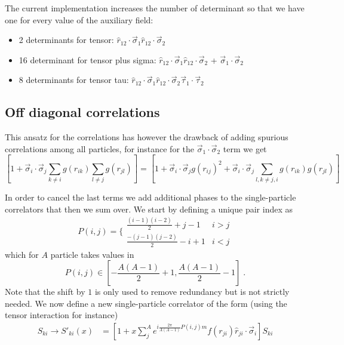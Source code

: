 \documentclass[a4paper]{article}
\begin{document}
The current implementation increases the number of determinant so that we have one for every value of the auxiliary field:
\begin{itemize}
\item 2 determinants for tensor: $\hat{r}_{12}\cdot\vec{\sigma}_1 \hat{r}_{12}\cdot\vec{\sigma}_2$
\item 16 determinant for tensor plus sigma: $\hat{r}_{12}\cdot\vec{\sigma}_1 \hat{r}_{12}\cdot\vec{\sigma}_2$ + $\vec{\sigma}_1\cdot\vec{\sigma}_2$
\item 8 determinants for tensor tau: $\hat{r}_{12}\cdot\vec{\sigma}_1 \hat{r}_{12}\cdot\vec{\sigma}_2\vec{\tau}_1\cdot\vec{\tau}_2$
\end{itemize}

\subsection{Off diagonal correlations}
This ansatz for the correlations has however the drawback of adding spurious correlations among all particles, for instance for the $\vec{\sigma}_1\cdot\vec{\sigma}_2$ term we get
\begin{equation}
\left[1+\vec{\sigma}_i\cdot\vec{\sigma}_j \sum_{k\neq i}g(r_{ik})\sum_{l\neq j}g(r_{jl})\right]=\left[1+\vec{\sigma}_i\cdot\vec{\sigma}_jg(r_{ij})^2+\vec{\sigma}_i\cdot\vec{\sigma}_j \sum_{l,k\neq j,i}g(r_{ik})g(r_{jl})\right]
\end{equation}

In order to cancel the last terms we add additional phases to the single-particle correlators that then we sum over. We start by defining a unique pair index as
\begin{equation}
P(i,j)=\bigg\{\begin{matrix}
\frac{(i-1)(i-2)}{2}+j-1 & i>j \\
\frac{-(j-1)(j-2)}{2}-i+1 & i<j
\end{matrix}
\end{equation}
which for $A$ particle takes values in
\begin{equation}
P(i,j) \in \left[-\frac{A(A-1)}{2}+1,\frac{A(A-1)}{2}-1\right]\;.
\end{equation}
Note that the shift by $1$ is only used to remove redundancy but is not strictly needed.
We now define a new single-particle correlator of the form (using the tensor interaction for instance)
\begin{equation}
\begin{split}
S_{ki} \to S'_{ki}(x) &= \left[ 1 + x \sum_j^A e^{i\frac{2\pi}{A(A-1)}P(i,j)m} f(r_{ji}) \hat{r}_{ji}\cdot\vec{\sigma}_i\right]S_{ki}
\end{split}
\end{equation}
\end{document}
